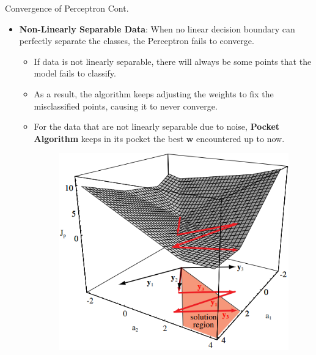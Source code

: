 \documentclass[serif, aspectratio=169]{beamer}
\begin{document}
\begin{frame}{Convergence of Perceptron Cont.}
    \begin{itemize}\itemsep1.5em
        \item \textbf{Non-Linearly Separable Data}:
        When no linear decision boundary can perfectly separate the classes, the Perceptron fails to converge.
        \medskip
        \begin{itemize}\itemsep1em
            \item If data is not linearly separable, there will always be some points that the model fails to classify.
            \item As a result, the algorithm keeps adjusting the weights to fix the misclassified points, causing it to never converge.
            \item For the data that are not linearly separable due to noise, \textbf{Pocket Algorithm} keeps in its pocket the best \(\mathbf{w}\) encountered up to now.
        \endminipage
        \hspace{1.5cm}
        \begin{figure}
            \centering
            \includegraphics[width=.9\linewidth]{pic/Figure_15.png}
        \end{figure}
        \endminipage
        \end{itemize}
    \end{itemize}
    \vfill
\end{frame}
\end{document}
